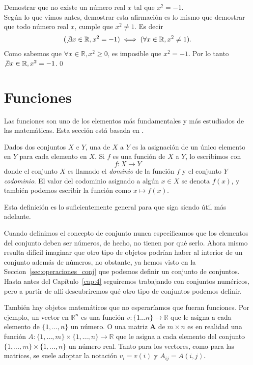 \documentclass[12pt]{book}
\begin{document}
\begin{exampleenv}
    Demostrar que no existe un número real $x$ tal que $x^2=-1$.\\

    Según lo que vimos antes, demostrar esta afirmación es lo mismo que demostrar que todo número real $x$, cumple que $x^2\neq1$. Es decir
    \[
    (\not\exists x\in \mathbb{R}, x^2=-1)\iff (\forall x\in \mathbb{R}, x^2\neq1).
    \]
    Como sabemos que $\forall x\in \mathbb{R}, x^2\ge 0$, es imposible que $x^2=-1$. Por lo tanto $\not\exists x\in \mathbb{R}, x^2=-1$.\qed
\end{exampleenv}

\section{Funciones}\label{sec:funciones}
\noindent
Las funciones son uno de los elementos más fundamentales y más estudiados de las matemáticas. Esta sección está basada en \cite[Part II, Chapter 8]{eccles2013introduction}.

\begin{definitionenv}
    Dados dos conjuntos $X$ e $Y$, una  de $X$ a $Y$ es la asignación de un único elemento en $Y$ para cada elemento en $X$. Si $f$ es una función de $X$ a $Y$, lo escribimos con
    \[
        f:X\rightarrow Y
    \]
    donde el conjunto $X$ es llamado el \textit{dominio} de la función $f$ y el conjunto $Y$ \textit{codominio}. El valor del codominio asignado a algún $x\in X$ se denota $f(x)$, y también podemos escribir la función como $x\mapsto f(x)$. 
\end{definitionenv}

Esta definición es lo suficientemente general para que siga siendo útil más adelante.

Cuando definimos el concepto de conjunto nunca especificamos que los elementos del conjunto deben ser números, de hecho, no tienen por qué serlo. Ahora mismo resulta difícil imaginar que otro tipo de objetos podrían haber al interior de un conjunto además de números, no obstante, ya hemos visto en la Seccion~\ref{sec:operaciones_conj} que podemos definir un conjunto de conjuntos. Hasta antes del Capítulo~\ref{cap:4} seguiremos trabajando con conjuntos numéricos, pero a partir de allí descubriremos qué otro tipo de conjuntos podemos definir.

También hay objetos matemáticos que no esperaríamos que fueran funciones. Por ejemplo, un vector en $\mathbb{R}^n$ es una función $v:\{1\dots n\}\to \mathbb{R}$ que le asigna a cada elemento de $\{1,\dots,n\}$ un número. O una matriz $\mathbf{A}$ de $m\times n$ es en realidad una función $A:\{1,\dots,m\}\times \{1,\dots,n\}\to \mathbb{R}$ que le asigna a cada elemento del conjunto $\{1,\dots,m\}\times \{1,\dots,n\}$ un número real. Tanto para los vectores, como para las matrices, se suele adoptar la notación $v_i=v(i)$ y $A_{ij}=A(i,j)$. 
\end{document}
